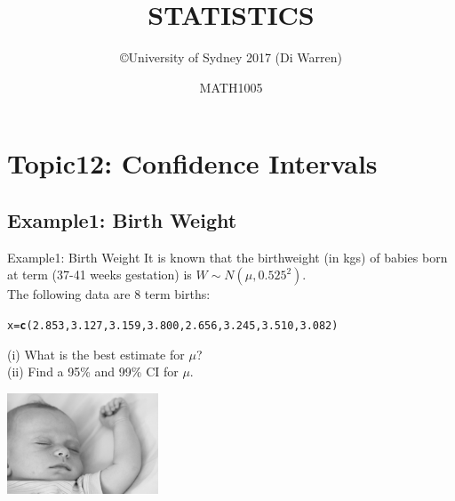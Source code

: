 \documentclass[t,xcolor=pdftex,dvipsnames,table]{beamer}
\title{\Huge STATISTICS}
\subtitle{}
\author{\copyright University of Sydney 2017 (Di Warren)}
\date{MATH1005}
\makeatletter
\newcommand{\hlnum}[1]{\textcolor[rgb]{0.686,0.059,0.569}{#1}}%
\newcommand{\hlstd}[1]{\textcolor[rgb]{0.345,0.345,0.345}{#1}}%
\newcommand{\hlkwb}[1]{\textcolor[rgb]{0.69,0.353,0.396}{#1}}%
\newcommand{\hlkwd}[1]{\textcolor[rgb]{0.737,0.353,0.396}{\textbf{#1}}}%
\newenvironment{kframe}{%
 \def\at@end@of@kframe{}%
 \ifinner\ifhmode%
  \def\at@end@of@kframe{\end{minipage}}%
  \begin{minipage}{\columnwidth}%
 \fi\fi%
 \def\FrameCommand##1{\hskip\@totalleftmargin \hskip-\fboxsep
 \colorbox{shadecolor}{##1}\hskip-\fboxsep
     \hskip-\linewidth \hskip-\@totalleftmargin \hskip\columnwidth}%
 \MakeFramed {\advance\hsize-\width
   \@totalleftmargin\z@ \linewidth\hsize
   \@setminipage}}%
 {\par\unskip\endMakeFramed%
 \at@end@of@kframe}
\newenvironment{knitrout}{}{} %
\makeatother
\begin{document}
\section[12]{Topic12: Confidence Intervals}

\subsection[Examples]{Example1: Birth Weight}
\begin{frame}{Example1: Birth Weight}
It is known that the birthweight (in kgs) of babies born at term (37-41 weeks gestation) is $W \sim N(\mu,0.525^2)$. \\

The following data are 8 term births:

\begin{knitrout}
\color{fgcolor}\begin{kframe}
\begin{alltt}
\hlstd{x}\hlkwb{=}\hlkwd{c}\hlstd{(}\hlnum{2.853}\hlstd{,}\hlnum{3.127}\hlstd{,}\hlnum{3.159}\hlstd{,}\hlnum{3.800}\hlstd{,}\hlnum{2.656}\hlstd{,}\hlnum{3.245}\hlstd{,}\hlnum{3.510}\hlstd{,}\hlnum{3.082}\hlstd{)}
\end{alltt}
\end{kframe}
\end{knitrout}

\vspace{.5cm}
(i) What is the best estimate for $\mu$? \\

(ii) Find a 95\% and 99\% CI for $\mu$. \\

\begin{center}
\includegraphics[height=3cm]{../images/Baby.jpg}
\end{center}
\end{frame}
\end{document}
